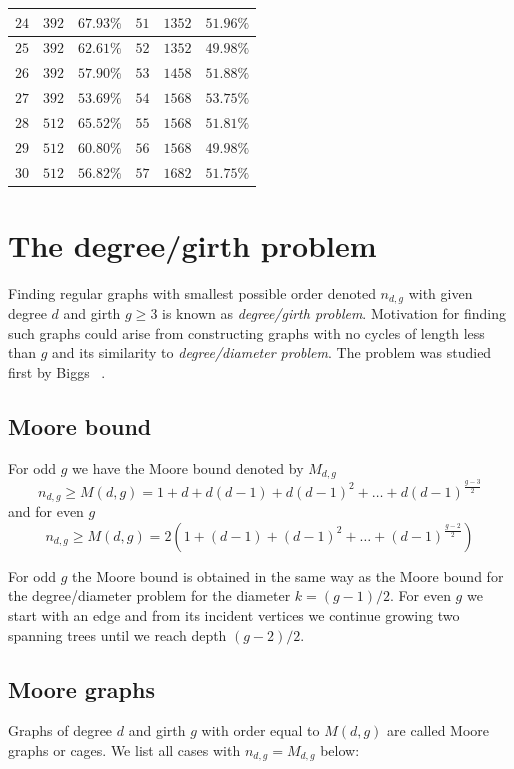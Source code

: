 \documentclass[a4paper,12pt,oneside]{report}%
\begin{document}
\begin{center}
{\begin{tabular}{| l | l | l | l | l | l |}
			$24$ & $392$ & $67.93\%$ &       			$51$ & $1352$ & $51.96\%$ \\ \hline
			$25$ & $392$ & $62.61\%$ &       			$52$ & $1352$ & $49.98\%$ \\ \hline
			$26$ & $392$ & $57.90\%$ &       			$53$ & $1458$ & $51.88\%$ \\ \hline
			$27$ & $392$ & $53.69\%$ &       			$54$ & $1568$ & $53.75\%$ \\ \hline
			$28$ & $512$ & $65.52\%$ &       			$55$ & $1568$ & $51.81\%$ \\ \hline
			$29$ & $512$ & $60.80\%$ &       			$56$ & $1568$ & $49.98\%$ \\ \hline
			$30$ & $512$ & $56.82\%$ &       			$57$ & $1682$ & $51.75\%$ \\ \hline
		\end{tabular}
	}
\end{center}
\newpage
\section{The degree/girth problem}
Finding regular graphs with smallest possible order denoted $n_{d,g}$ with given degree $d$ and girth $g\geq3$ is known as {\em degree/girth problem}. Motivation for finding such graphs could arise from constructing graphs with no cycles of length less than $g$ and its similarity to {\em degree/diameter problem}. The problem was studied first by Biggs ~\cite{Biggs}.
\subsection{Moore bound}
For odd $g$ we have the Moore bound denoted by $M_{d,g}$
\begin{equation*}
	n_{d,g} \geq M(d,g) = 1 + d + d(d - 1) + d(d - 1)^{2} + \dots + d(d - 1)^{\frac{g-3}{2}}
\end{equation*}	
and for even $g$
\begin{equation*}
	n_{d,g} \geq M(d,g) = 2(1 + (d - 1) + (d - 1)^{2} + \dots + (d - 1)^{\frac{g-2}{2}})
\end{equation*}	

For odd $g$ the Moore bound is obtained in the same way as the Moore bound for the degree/diameter problem for the diameter $k=(g-1)/2$. For even $g$ we start with an edge and from its incident vertices we continue growing two spanning trees until we reach depth $(g-2)/2$.
\subsection{Moore graphs}
Graphs of degree $d$ and girth $g$ with order equal to $M(d,g)$ are called Moore graphs or cages. We list all cases with $n_{d,g} = M_{d,g}$ below:
\end{document}
